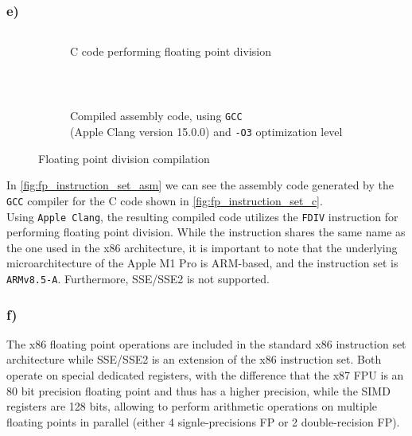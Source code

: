 \documentclass[tikz,14pt,fleqn]{article}
\begin{document}
\subsubsection*{e)}
\begin{figure}[h!]
    \vspace*{-0.5cm}
    \begin{subfigure}{1\linewidth}
        \centering
        \inputminted[fontsize=\scriptsize, bgcolor=CODEBG]{C}{../ex1/fp_instruction_set.c}
        \caption{C code performing floating point division}
        \label{fig:fp_instruction_set_c}
    \end{subfigure}\\
    \begin{subfigure}{1\linewidth}
        \centering
        \inputminted[fontsize=\scriptsize, bgcolor=CODEBG]{asm}{../ex1/fp_instruction_set.s}
        \caption{\small Compiled assembly code, using \texttt{GCC} \\(Apple Clang version 15.0.0) and \texttt{-O3} optimization level}
        \label{fig:fp_instruction_set_asm}
    \end{subfigure}
    \caption{Floating point division compilation}
    \vspace*{-0.7cm}
\end{figure}
In \autoref{fig:fp_instruction_set_asm} we can see the assembly code generated by the \texttt{GCC} compiler for the C code shown in \autoref{fig:fp_instruction_set_c}.\\
Using \texttt{Apple Clang}, the resulting compiled code utilizes the \texttt{FDIV} instruction for performing floating point division. While the instruction shares the same name as the one used in the x86 architecture, it is important to note that the underlying microarchitecture of the Apple M1 Pro is ARM-based, and the instruction set is \texttt{ARMv8.5-A}. Furthermore, SSE/SSE2 is not supported.
\subsubsection*{f)}
The x86 floating point operations are included in the standard x86 instruction set architecture while SSE/SSE2 is an extension of the x86 instruction set. Both operate on special dedicated registers, with the difference that the x87 FPU is an 80 bit precision floating point and thus has a higher precision, while the SIMD registers are 128 bits, allowing to perform arithmetic operations on multiple floating points in parallel (either 4 signle-precisions FP or 2 double-recision FP).
\end{document}

